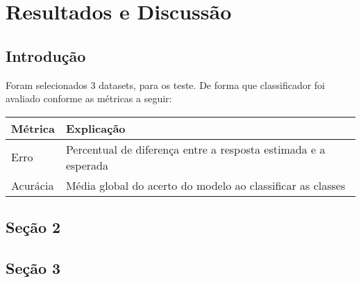 \chapter{Resultados e Discussão}
\label{chap:resultados}

\section{Introdução}

Foram selecionados 3 datasets, para os teste. De forma que classificador foi avaliado conforme
as métricas a seguir:


\begin{table}[H]
    \begin{tabular}{@{}ll@{}}
        \toprule
        \textbf{Métrica} & \textbf{Explicação}                                            \\ \midrule
            Erro             & Percentual de diferença entre a resposta estimada e a esperada \\
            Acurácia         & Média global do acerto do modelo ao classificar as classes     \\ \bottomrule
    
    \end{tabular}
    \end{table}


\section{Seção 2}




\section{Seção 3}